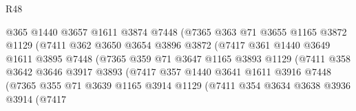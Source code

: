 \begin{lexlean}{R48}
\begin{coremodule}
                              @365
                              @1440
                              @3657
                              @1611
                              @3874
                              @7448
                              (@7365
                                @363
                                @71
                                @3655
                                @1165
                                @3872
                                @1129
                                (@7411
                                  @362
                                  @3650
                                  @3654
                                  @3896
                                  @3872
                                  (@7417
                                    @361
                                    @1440
                                    @3649
                                    @1611
                                    @3895
                                    @7448
                                    (@7365
                                      @359
                                      @71
                                      @3647
                                      @1165
                                      @3893
                                      @1129
                                      (@7411
                                        @358
                                        @3642
                                        @3646
                                        @3917
                                        @3893
                                        (@7417
                                          @357
                                          @1440
                                          @3641
                                          @1611
                                          @3916
                                          @7448
                                          (@7365
                                            @355
                                            @71
                                            @3639
                                            @1165
                                            @3914
                                            @1129
                                            (@7411
                                              @354
                                              @3634
                                              @3638
                                              @3936
                                              @3914
                                              (@7417

\end{coremodule}
\end{lexlean}
